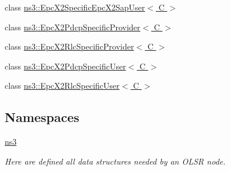 \begin{DoxyCompactItemize}
class \hyperlink{classns3_1_1EpcX2SpecificEpcX2SapUser}{ns3\+::\+Epc\+X2\+Specific\+Epc\+X2\+Sap\+User$<$ C $>$}
\item 
class \hyperlink{classns3_1_1EpcX2PdcpSpecificProvider}{ns3\+::\+Epc\+X2\+Pdcp\+Specific\+Provider$<$ C $>$}
\item 
class \hyperlink{classns3_1_1EpcX2RlcSpecificProvider}{ns3\+::\+Epc\+X2\+Rlc\+Specific\+Provider$<$ C $>$}
\item 
class \hyperlink{classns3_1_1EpcX2PdcpSpecificUser}{ns3\+::\+Epc\+X2\+Pdcp\+Specific\+User$<$ C $>$}
\item 
class \hyperlink{classns3_1_1EpcX2RlcSpecificUser}{ns3\+::\+Epc\+X2\+Rlc\+Specific\+User$<$ C $>$}
\end{DoxyCompactItemize}
\subsection*{Namespaces}
\begin{DoxyCompactItemize}
\item 
 \hyperlink{namespacens3}{ns3}
\begin{DoxyCompactList}\small\item\em Here are defined all data structures needed by an O\+L\+SR node. \end{DoxyCompactList}\end{DoxyCompactItemize}
